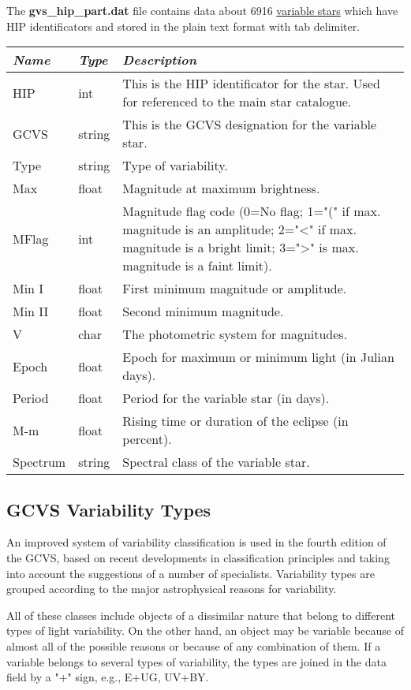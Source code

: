 The \textbf{gvs\_hip\_part.dat} file contains data about 6916
\href{Variable_Stars}{variable stars} which have HIP identificators and
stored in the plain text format with tab delimiter.

\begin{longtabu} to \textwidth {l|l|X}
\toprule
\emph{Name} & \emph{Type} & \emph{Description}\tabularnewline
\midrule
HIP & int & This is the HIP identificator for the star. Used for
referenced to the main star catalogue.\tabularnewline
GCVS & string & This is the GCVS designation for the variable
star.\tabularnewline
\midrule
Type & string & Type of variability.\tabularnewline
\midrule
Max & float & Magnitude at maximum brightness.\tabularnewline
\midrule
MFlag & int & Magnitude flag code (0=No flag; 1="(" if max. magnitude is
an amplitude; 2="\textless{}" if max. magnitude is a bright limit;
3="\textgreater{}" is max. magnitude is a faint limit).\tabularnewline
\midrule
Min I & float & First minimum magnitude or amplitude.\tabularnewline
\midrule
Min II & float & Second minimum magnitude.\tabularnewline
\midrule
V & char & The photometric system for magnitudes.\tabularnewline
\midrule
Epoch & float & Epoch for maximum or minimum light (in Julian
days).\tabularnewline
\midrule
Period & float & Period for the variable star (in days).\tabularnewline
\midrule
M-m & float & Rising time or duration of the eclipse (in
percent).\tabularnewline
\midrule
Spectrum & string & Spectral class of the variable star.\tabularnewline
\bottomrule
\end{longtabu}

\subsection{GCVS Variability Types}\label{gcvs-variability-types}

An improved system of variability classification is used in the fourth
edition of the GCVS, based on recent developments in classification
principles and taking into account the suggestions of a number of
specialists. Variability types are grouped according to the major
astrophysical reasons for variability.

All of these classes include objects of a dissimilar nature that belong
to different types of light variability. On the other hand, an object
may be variable because of almost all of the possible reasons or because
of any combination of them. If a variable belongs to several types of
variability, the types are joined in the data field by a "+" sign, e.g.,
E+UG, UV+BY.


